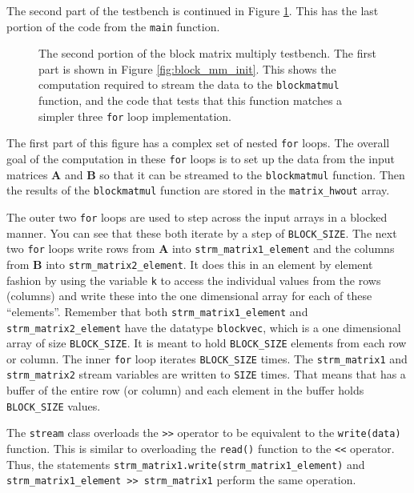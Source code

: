 The second part of the testbench is continued in Figure \ref{fig:block_mm_final}. This has the last portion of the code from the \lstinline{main} function. 

\begin{figure}
{\tiny }
\caption{  The second portion of the block matrix multiply testbench. The first part is shown in Figure \ref{fig:block_mm_init}. This shows the computation required to stream the data to the \lstinline{blockmatmul} function, and the code that tests that this function matches a simpler three \lstinline{for} loop implementation. }
\label{fig:block_mm_final}
\end{figure}

The first part of this figure has a complex set of nested \lstinline{for} loops. The overall goal of the computation in these \lstinline{for} loops is to set up the data from the input matrices $\mathbf{A}$ and $\mathbf{B}$ so that it can be streamed to the \lstinline{blockmatmul} function. Then the results of the \lstinline{blockmatmul} function are stored in the \lstinline{matrix_hwout} array. 

The outer two \lstinline{for} loops are used to step across the input arrays in a blocked manner. You can see that these both iterate by a step of \lstinline{BLOCK_SIZE}. The next two \lstinline{for} loops write rows from $\mathbf{A}$ into \lstinline{strm_matrix1_element} and the columns from $\mathbf{B}$ into \lstinline{strm_matrix2_element}. It does this in an element by element fashion by using the variable \lstinline{k} to access the individual values from the rows (columns) and write these into the one dimensional array for each of these ``elements''. Remember that both \lstinline{strm_matrix1_element} and \lstinline{strm_matrix2_element} have the datatype \lstinline{blockvec}, which is a one dimensional array of size \lstinline{BLOCK_SIZE}. It is meant to hold \lstinline{BLOCK_SIZE} elements from each row or column. The inner \lstinline{for} loop iterates \lstinline{BLOCK_SIZE} times. The \lstinline{strm_matrix1} and \lstinline{strm_matrix2} stream variables are written to \lstinline{SIZE} times. That means that has a buffer of the entire row (or column) and each element in the buffer holds \lstinline{BLOCK_SIZE} values. 

\begin{aside}
The \lstinline{stream} class overloads the \lstinline{>>} operator to be equivalent to the \lstinline{write(data)} function. This is similar to overloading the \lstinline{read()} function to the \lstinline{<<} operator. Thus, the statements \lstinline{strm_matrix1.write(strm_matrix1_element)} and \lstinline{strm_matrix1_element >> strm_matrix1} perform the same operation.
\end{aside}

